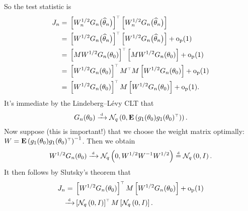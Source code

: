 \documentclass[11pt,letterpaper,reqno,oneside]{article}
\begin{document}
So the test statistic is
%
\begin{align*}
	J_n
	={}& \left[ W_n^{1/2} G_n\bigl( \widehat{\theta}_n \bigr) \right]^{\scriptscriptstyle \top} 
	\left[ W_n^{1/2} G_n\bigl( \widehat{\theta}_n \bigr) \right] 
	\\
	={}& \left[ W^{1/2} G_n\bigl( \widehat{\theta}_n \bigr) \right]^{\scriptscriptstyle \top} 
	\left[ W^{1/2} G_n\bigl( \widehat{\theta}_n \bigr) \right] 
	+ \mathrm{o}_{\mathrm{p}}(1)
	\\
	={}& \left[ M W^{1/2} G_n( \theta_0 ) \right]^{\scriptscriptstyle \top} 
	\left[ M W^{1/2} G_n( \theta_0 ) \right] 
	+ \mathrm{o}_{\mathrm{p}}(1)
	\\
	={}& \left[ W^{1/2} G_n( \theta_0 ) \right]^{\scriptscriptstyle \top} 
	M^{\scriptscriptstyle \top} M
	\left[ W^{1/2} G_n( \theta_0 ) \right] 
	+ \mathrm{o}_{\mathrm{p}}(1) 
	\\
	={}& \left[ W^{1/2} G_n( \theta_0 ) \right]^{\scriptscriptstyle \top} 
	M
	\left[ W^{1/2} G_n( \theta_0 ) \right] 
	+ \mathrm{o}_{\mathrm{p}}(1) .
\end{align*}
%
It's immediate by the Lindeberg--Lévy CLT that 
%
\begin{equation*}
	G_n( \theta_0 ) \xrightarrow{{\scriptscriptstyle \mathrm{\;d\;}}} 
	\mathcal{N}_q\left( 0, \mathbf{E}\left( g_1(\theta_0) g_1(\theta_0)^{\scriptscriptstyle \top} \right) \right) .
\end{equation*}
%
Now suppose (this is important!) that we choose the weight matrix optimally: $W = \mathbf{E}\left( g_1(\theta_0) g_1(\theta_0)^{\scriptscriptstyle \top} \right)^{-1}$. Then we obtain
%
\begin{equation*}
	W^{1/2} G_n( \theta_0 ) 
	\xrightarrow{{\scriptscriptstyle \mathrm{\;d\;}}} \mathcal{N}_q\left( 0, W^{1/2} W^{-1} W^{1/2} \right) 
	\protect\overset{{\scriptscriptstyle \mathrm{d}}}{=} \mathcal{N}_q\left( 0, I \right) .
\end{equation*}
%
It then follows by Slutsky's theorem that
%
\begin{align*}
	J_n
	={}& \left[ W^{1/2} G_n( \theta_0 ) \right]^{\scriptscriptstyle \top} 
	M
	\left[ W^{1/2} G_n( \theta_0 ) \right] 
	+ \mathrm{o}_{\mathrm{p}}(1)
	\\
	\xrightarrow{{\scriptscriptstyle \mathrm{\;d\;}}}& 
	\left[ \mathcal{N}_q\left( 0, I \right) \right]^{\scriptscriptstyle \top} 
	M
	\left[ \mathcal{N}_q\left( 0, I \right) \right] .
\end{align*}
\end{document}
